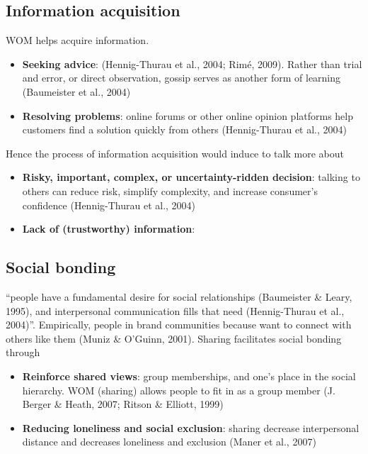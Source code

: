 \documentclass[
]{book}
\providecommand{\tightlist}{%
  \setlength{\itemsep}{0pt}\setlength{\parskip}{0pt}}
\begin{document}
\hypertarget{information-acquisition}{%
\subsection{Information acquisition}\label{information-acquisition}}

WOM helps acquire information.

\begin{itemize}
\tightlist
\item
  \textbf{Seeking advice}: (Hennig-Thurau et al., 2004; Rimé, 2009). Rather than trial and error, or direct observation, gossip serves as another form of learning (Baumeister et al., 2004)\\
\item
  \textbf{Resolving problems}: online forums or other online opinion platforms help customers find a solution quickly from others (Hennig-Thurau et al., 2004)
\end{itemize}

Hence the process of information acquisition would induce to talk more about

\begin{itemize}
\tightlist
\item
  \textbf{Risky, important, complex, or uncertainty-ridden decision}: talking to others can reduce risk, simplify complexity, and increase consumer's confidence (Hennig-Thurau et al., 2004)
\item
  \textbf{Lack of (trustworthy) information}:
\end{itemize}

\hypertarget{social-bonding}{%
\subsection{Social bonding}\label{social-bonding}}

``people have a fundamental desire for social relationships (Baumeister \& Leary, 1995), and interpersonal communication fills that need (Hennig-Thurau et al., 2004)''. Empirically, people in brand communities because want to connect with others like them (Muniz \& O'Guinn, 2001). Sharing facilitates social bonding through

\begin{itemize}
\tightlist
\item
  \textbf{Reinforce shared views}: group memberships, and one's place in the social hierarchy. WOM (sharing) allows people to fit in as a group member (J. Berger \& Heath, 2007; Ritson \& Elliott, 1999)
\item
  \textbf{Reducing loneliness and social exclusion}: sharing decrease interpersonal distance and decreases loneliness and exclusion (Maner et al., 2007)
\end{itemize}
\end{document}
